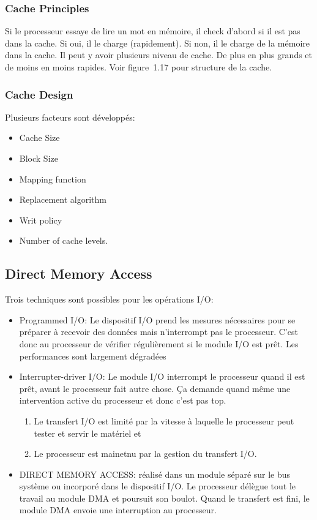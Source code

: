 \subsubsection{Cache Principles}
Si le processeur essaye de lire un mot en mémoire,
il check d'abord si il est pas dans la cache.
Si oui, il le charge (rapidement).
Si non, il le charge de la mémoire dans la cache.
Il peut y avoir plusieurs niveau de cache.
De plus en plus grands et de moins en moins rapides.
Voir figure~1.17 pour structure de la cache.

\subsubsection{Cache Design}
Plusieurs facteurs sont développés:
\begin{itemize}
	\item Cache Size
	\item Block Size
	\item Mapping function
	\item Replacement algorithm
	\item Writ policy
	\item Number of cache levels.
\end{itemize}

\subsection{Direct Memory Access}
Trois techniques sont possibles pour les opérations I/O:
\begin{itemize}
	\item Programmed I/O: Le dispositif I/O prend les mesures nécessaires pour se préparer à recevoir des données mais n'interrompt pas le processeur.
      C'est donc au processeur de vérifier régulièrement si le module I/O est prêt.
      Les performances sont largement dégradées
	\item Interrupter-driver I/O: Le module I/O interrompt le processeur quand il est prêt,
      avant le processeur fait autre chose.
      Ça demande quand même une intervention active du processeur et donc c'est pas top.
      \begin{enumerate}
        \item Le transfert I/O est limité par la vitesse à laquelle le processeur peut tester et servir le matériel et
        \item Le processeur est mainetnu par la gestion du transfert I/O.
      \end{enumerate}
	\item DIRECT MEMORY ACCESS: réalisé dans un module séparé sur le bus système ou incorporé dans le dispositif I/O.
      Le processeur délègue tout le travail au module DMA et poursuit son boulot.
      Quand le transfert est fini, le module DMA envoie une interruption au processeur.
\end{itemize}


